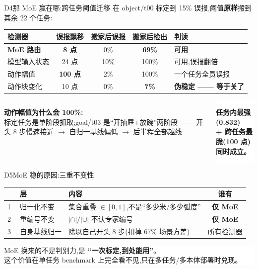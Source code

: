 \documentclass[aspectratio=169,10pt]{beamer}
\newcommand{\hi}[1]{{\color{teal}\bfseries #1}}
\newcommand{\wi}[1]{{\color{gold}\bfseries #1}}
\newcommand{\bad}[1]{{\color{brick}\bfseries #1}}
\begin{document}
\begin{frame}{D4\quad 那 MoE 赢在哪:跨任务阈值迁移}
  \footnotesize
  在 object/t00 标定到 15\% 误报,阈值\textbf{原样}搬到其余 22 个任务:
  \begin{center}
  \begin{tabular}{@{}lcccl@{}}
    \toprule
    \textbf{检测器} & \textbf{误报飘移} & \textbf{搬家后误报} & \textbf{搬家后检出} & \textbf{判读} \\ \midrule
    \textbf{MoE 路由} & \hi{8 点} & 0\% & \hi{69\%} & \hi{可用} \\
    模型输入状态      & 24 点 & 10\% & 100\% & 可用,误报翻倍 \\
    动作幅值          & \bad{100 点} & 2\% & 100\% & 一个任务全员误报 \\
    动作块变化        & 10 点 & 0\% & \bad{7\%} & \bad{伪稳定 —— 等于关了} \\ \bottomrule
  \end{tabular}
  \end{center}
  \vfill
  \begin{columns}[T]
      \textbf{动作幅值为什么会 100\%:}\\
      标定任务是单阶段抓取;goal/t03 是“开抽屉+放碗”两阶段 —— 开头 8 步慢速接近
      $\rightarrow$ 自归一基线偏低 $\rightarrow$ 后半程全部越线
      \colorbox{white}{\parbox{0.95\linewidth}{\vspace{2pt}
        \wi{任务内最强(0.832)\\ + 跨任务最脆(100 点)\\ 同时成立。}\vspace{2pt}}}
  \end{columns}
\end{frame}

\begin{frame}{D5\quad MoE 稳的原因:三重不变性}
  \small\vfill
  \begin{center}
  \begin{tabular}{@{}clp{4.6cm}c@{}}
    \toprule
    & \textbf{层} & \textbf{内容} & \textbf{谁有} \\ \midrule
    \textcircled{1} & 归一化不变 & 集合重叠 $\in[0,1]$,不是“多少米/多少弧度” & \hi{仅 MoE} \\
    \textcircled{2} & 重编号不变 & $|\cap|/|\cup|$ 不认专家编号 & \hi{仅 MoE} \\
    \textcircled{3} & 自身基线归一 & 除以自己开头 8 步(扣掉 67\% 场景方差) & 所有检测器 \\ \bottomrule
  \end{tabular}
  \end{center}
  \vfill
  \begin{center}
  \colorbox{white}{\parbox{0.88\textwidth}{\centering\vspace{3pt}
    {\large MoE 换来的不是判别力,是 \wi{“一次标定,到处能用”}。}\\[3pt]
    \small 这个价值在单任务 benchmark 上完全看不见,只在多任务/多本体部署时兑现。\vspace{3pt}}}
  \end{center}
\end{frame}
\end{document}
